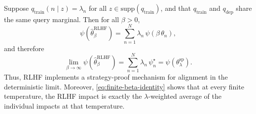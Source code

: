
\begin{theorem}\label{thm:rlhf-sp-convergence}
    Suppose $q_{\mathrm{train}}(n \mid z) = \lambda_n$ for all 
    $z \in \mathrm{supp}(q_{\mathrm{train}})$, and that 
    $q_{\mathrm{train}}$ and $q_{\mathrm{dep}}$ share the same 
    query marginal. Then for all $\beta > 0$,
    \begin{equation}\label{eq:finite-beta-identity}
        \psi\!\left(\hat{\theta}_\beta^{\mathrm{RLHF}}\right) 
        = \sum_{n=1}^N \lambda_n \, \psi(\beta\,\theta_n),
    \end{equation}
    and therefore
    \begin{equation}
        \lim_{\beta \to \infty} 
        \psi\!\left(\hat{\theta}_\beta^{\mathrm{RLHF}}\right)
        = \sum_{n=1}^N \lambda_n \, \psi_n^\star
        = \psi\!\left(\theta_\lambda^{\mathrm{sp}}\right).
    \end{equation}
    Thus, RLHF implements a strategy-proof mechanism for alignment 
    in the deterministic limit. Moreover, \eqref{eq:finite-beta-identity} 
    shows that at every finite temperature, the RLHF impact is exactly 
    the $\lambda$-weighted average of the individual impacts at that 
    temperature.
\end{theorem}

